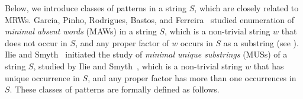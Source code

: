 

Below, we introduce classes of patterns in a string $S$, which are closely related to MRWs. 
Garcia, Pinho, Rodrigues, Bastos, and Ferreira~\cite{garcia2011minimal} studied enumeration of \textit{minimal absent words} (MAWs) in a string $S$, which is a non-trivial string $w$ that does not occur in $S$, and any proper factor of $w$ occurs in $S$ as a substring (see \cite{garcia2011minimal}).
Ilie and Smyth~\cite{ilie2011minimum} initiated the study of \textit{minimal unique substrings} (MUSs) of a string $S$, studied by Ilie and Smyth~\cite{ilie2011minimum}, which is a non-trivial string $w$ that has unique occurrence in $S$, and any proper factor has more than one occurrences in $S$.
These classes of patterns are formally defined as follows. 

